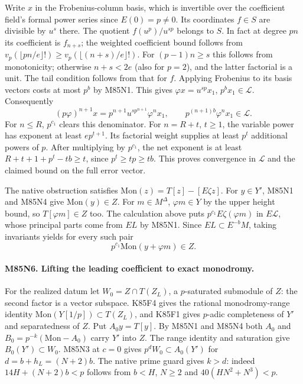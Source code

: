 Write $x$ in the Frobenius-column basis, which is invertible over
the coefficient field's formal power series since $E(0)=p\ne0$.
Its coordinates $f\in S$ are divisible by $u^s$ there. The
quotient $f(u^p)/u^{sp}$ belongs to $S$. In fact at degree
$pn$ its coefficient is $f_{n+s}$; the weighted coefficient
bound follows from
$v_p(\lfloor pn/e\rfloor !)\ge v_p(\lfloor(n+s)/e\rfloor!)$.
For $(p-1)n\ge s$ this follows from monotonicity; otherwise
$n+s<2e$ (also for $p=2$), and the latter factorial is a unit.
The tail condition follows from that for $f$. Applying Frobenius
to its basis vectors costs at most $p^b$ by M85N1. This gives
$\varphi x=u^{sp}x_1$, $p^b x_1\in\mathcal L$.
Consequently
\[
 (p\varphi)^{n+1}x
   =p^{n+1}u^{sp^{n+1}}\varphi^n x_1,\qquad
 p^{(n+1)b}\varphi^n x_1\in\mathcal L .
\]
For $n\le R$, $p^{c_1}$ clears this denominator. For
$n=R+t$, $t\ge1$, the variable power has exponent at least
$ep^{t+1}$. Its factorial weight supplies at least $p^t$
additional powers of $p$. After multiplying by $p^{c_1}$,
the net exponent is at least
$R+t+1+p^t-tb\ge t$, since $p^t\ge tp\ge tb$.
This proves convergence in $\mathcal L$ and the claimed
bound on the full error vector.

The native obstruction satisfies
$\mathrm{Mon}(z)=T[z]-[E\zeta z]$. For $y\in Y'$,
M85N1 and M85N4 give $\mathrm{Mon}(y)\in Z$.
For $m\in M^\Delta$, $\varphi m\in Y$ by the upper height
bound, so $T[\varphi m]\in Z$ too. The calculation above
puts $p^{c_1}E\zeta(\varphi m)$ in $E\mathcal L$, whose
principal parts come from $EL$ by M85N1. Since $EL\subset
E^{-b}M$, taking invariants yields for every such pair
\[
      p^{c_1}\mathrm{Mon}(y+\varphi m)\in Z .
\]

\paragraph{M85N6. Lifting the leading coefficient to exact monodromy.}
For the realized datum let
$W_0=Z\cap T(Z_L)$, a $p$-saturated submodule of $Z$:
the second factor is a vector subspace. K85F4 gives the rational
monodromy-range identity $\mathrm{Mon}(Y[1/p])\subset T(Z_L)$,
and K85F1 gives $p$-adic completeness of $Y'$ and separatedness of $Z$.
Put $A_0 y=T[y]$. By M85N1 and M85N4 both $A_0$ and
$B_0=p^{-k}(\mathrm{Mon}-A_0)$ carry $Y'$ into $Z$.
The range identity and saturation give $B_0(Y')\subset W_0$.
M85N3 at $c=0$ gives $p^{d}W_0\subset A_0(Y')$ for
$d=b+h_L=(N+2)b$. The native prime guard gives $k>d$:
indeed $14H+(N+2)b<p$ follows from $b<H$, $N\ge2$ and
$40(HN^2+N^3)<p$.

